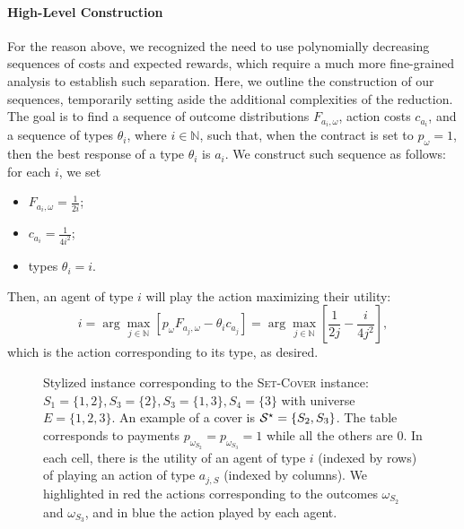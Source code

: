 \paragraph{High-Level Construction} For the reason above, we recognized the need to use polynomially decreasing sequences of costs and expected rewards, which require a much more fine-grained analysis to establish such separation. Here, we outline the construction of our sequences, temporarily setting aside the additional complexities of the reduction.
%
The goal is to find a sequence of outcome distributions $F_{a_i,\omega}$,  action costs $c_{a_i}$, and a sequence of types $\theta_i$, where $i \in \mathbb{N}$, such that, when the contract is set to $p_{\omega}=1$, then the best response of a type $\theta_i$ is $a_i$.
We construct such sequence as follows: for each $i$, we set
\begin{itemize}
\item $F_{a_i,\omega}= \frac{1}{2i} $;
\item $c_{a_i}=\frac{1}{4i^2}$;
\item  types $\theta_i=i$.
\end{itemize}
%
Then, an agent of type $i$ will play the action maximizing their utility:
\[
i=\arg \max_{j \in \mathbb{N}} \left[ p_\omega F_{a_j,\omega} -\theta_{i}c_{a_j} \right] =\arg \max_{j \in \mathbb{N}} \left[ \frac{1}{2j} -\frac{i}{4j^2} \right], 
\]
which is the action corresponding to its type, as desired.
\begin{figure}[!t]
    \centering
    \scalebox{0.7}{}
    \caption{Stylized instance corresponding to the \textsc{Set-Cover} instance: $S_1=\{1,2\},S_3=\{2\},S_3=\{1,3\},S_4=\{3\}$ with universe $E=\{1,2,3\}$. An example of a cover is $\mathcal{S}^\star=\{S_2,S_3\}$. The table corresponds to payments $p_{\omega_{S_2}}=p_{\omega_{S_3}}=1$ while all the others are $0$. In each cell, there is the utility of an agent of type $i$ (indexed by rows) of playing an action of type $a_{j,S}$ (indexed by columns). We highlighted in \textcolor{niceRed}{red} the actions corresponding to the outcomes $\omega_{S_2}$ and $\omega_{S_3}$, and in \textcolor{typ_blue}{blue} the action played by each agent.}
    \label{fig:instance}
\end{figure}
